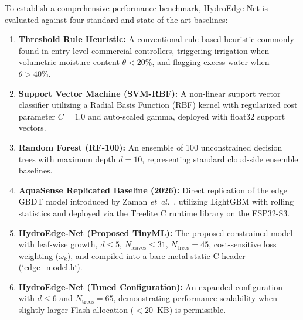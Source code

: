 To establish a comprehensive performance benchmark, HydroEdge-Net is evaluated against four standard and state-of-the-art baselines:
\begin{enumerate}
    \item \textbf{Threshold Rule Heuristic:} A conventional rule-based heuristic commonly found in entry-level commercial controllers, triggering irrigation when volumetric moisture content $\theta < 20\%$, and flagging excess water when $\theta > 40\%$.
    \item \textbf{Support Vector Machine (SVM-RBF):} A non-linear support vector classifier utilizing a Radial Basis Function (RBF) kernel with regularized cost parameter $C = 1.0$ and auto-scaled gamma, deployed with float32 support vectors.
    \item \textbf{Random Forest (RF-100):} An ensemble of 100 unconstrained decision trees with maximum depth $d = 10$, representing standard cloud-side ensemble baselines.
    \item \textbf{AquaSense Replicated Baseline (2026):} Direct replication of the edge GBDT model introduced by Zaman \textit{et~al.}~\cite{zaman2026aquasense}, utilizing LightGBM with rolling statistics and deployed via the Treelite C runtime library on the ESP32-S3.
    \item \textbf{HydroEdge-Net (Proposed TinyML):} The proposed constrained model with leaf-wise growth, $d \le 5$, $N_{\text{leaves}} \le 31$, $N_{\text{trees}} = 45$, cost-sensitive loss weighting ($\omega_k$), and compiled into a bare-metal static C header (`edge\_model.h`).
    \item \textbf{HydroEdge-Net (Tuned Configuration):} An expanded configuration with $d \le 6$ and $N_{\text{trees}} = 65$, demonstrating performance scalability when slightly larger Flash allocation ($<20$~KB) is permissible.
\end{enumerate}

